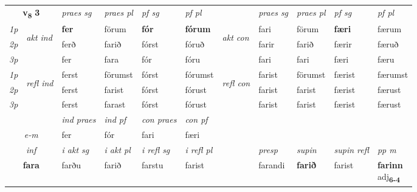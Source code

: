 \noindent
\begin{tabular}{lllllllllll} \toprule
\multicolumn{2}{c}{\textbf{v{\textsubscript{8}}} \Large{\textbf{3}}}  &  \textit{praes sg}  & \textit{praes pl}  &\textit{ pf sg} & \textit{pf pl} &  &  \textit{praes sg}  & \textit{praes pl}  & \textit{pf sg} & \textit{pf pl } \\*
	\cmidrule{3-6} \cmidrule{8-11}
 {\textit{1p}} & \multirow{3}{*}{\begin{turn}{90}\textit{akt ind}\end{turn}} & \textbf{fer} & förum & \textbf{fór} & \textbf{fórum} & \multirow{3}{*}{\begin{turn}{90}\textit{akt con}\end{turn}} &fari & förum & \textbf{færi} & færum\\*
 {\textit{2p}} &  &  ferð  & farið & fórst & fóruð & & farir & farið & færir & færuð \\*
{\textit{3p}} &  & fer & fara & fór & fóru & & fari & fari& færi & færu \\*
\cmidrule{3-6} \cmidrule{8-11}
 {\textit{1p}} & \multirow{3}{*}{\begin{turn}{90}\textit{refl ind}\end{turn}}  & ferst & förumst & fórst & fórumst & \multirow{3}{*}{\begin{turn}{90}\textit{refl con}\end{turn}}  &farist & förumst & færist & færumst \\*
 {\textit{2p}} &  & ferst & farist & fórst & fórust & &farist & farist & færist & færust \\*
 {\textit{3p}}  & & ferst & farast & fórst & fórust & & farist & farist& færist & færust \\*
\cmidrule{3-6} \cmidrule{8-11}

   & &  \textit{ind praes} & \textit{ind pf} & \textit{con praes} & \textit{con pf} \\*
\multicolumn{2}{c}{ \textit{e-m} } & fer & fór & fari & færi \\*

\cmidrule{3-11}
   \multicolumn{2}{c}{\textit{inf}}  & \textit{i akt sg} & \textit{i akt pl} & \textit{i refl sg} & \textit{i refl pl} && \textit{presp} & \textit{supin} & \textit{supin refl} & \textit{pp m} \\*
  \multicolumn{2}{c}{\textbf{fara}} & farðu  & farið & farstu & farist && farandi &  \textbf{farið} & farist & \specialcell{\textbf{farinn} \\ adj\textbf{\textsubscript{6-4}}} \\*
\end{tabular}

